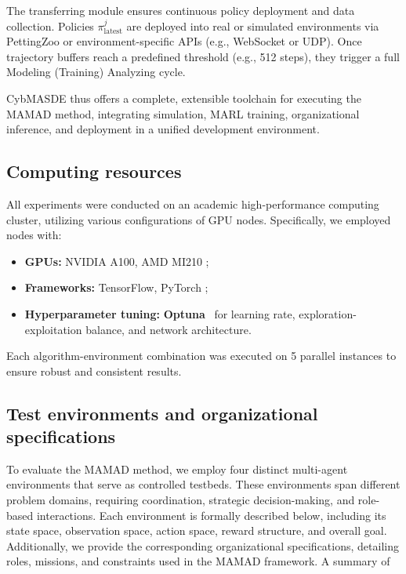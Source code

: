 \documentclass[pdflatex,sn-mathphys-num]{sn-jnl}%
\theoremstyle{thmstyleone}%
\theoremstyle{thmstyletwo}%
\theoremstyle{thmstylethree}%
\begin{document}
The transferring module ensures continuous policy deployment and data collection. Policies $\pi^j_{\text{latest}}$ are deployed into real or simulated environments via PettingZoo or environment-specific APIs (e.g., WebSocket or UDP). Once trajectory buffers reach a predefined threshold (e.g., 512 steps), they trigger a full Modeling (Training) Analyzing cycle.

CybMASDE thus offers a complete, extensible toolchain for executing the MAMAD method, integrating simulation, MARL training, organizational inference, and deployment in a unified development environment.



\subsection{Computing resources}

All experiments were conducted on an academic high-performance computing cluster, utilizing various configurations of GPU nodes. Specifically, we employed nodes with:
\begin{itemize}
    \item \textbf{GPUs:} NVIDIA A100, AMD MI210 ;
    \item \textbf{Frameworks:} TensorFlow, PyTorch ;
    \item \textbf{Hyperparameter tuning:} \textbf{Optuna}~\cite{akiba2019optuna} for learning rate, exploration-exploitation balance, and network architecture.
\end{itemize}

Each algorithm-environment combination was executed on 5 parallel instances to ensure robust and consistent results.

\subsection{Test environments and organizational specifications}

To evaluate the MAMAD method, we employ four distinct multi-agent environments that serve as controlled testbeds. These environments span different problem domains, requiring coordination, strategic decision-making, and role-based interactions. Each environment is formally described below, including its state space, observation space, action space, reward structure, and overall goal. Additionally, we provide the corresponding organizational specifications, detailing roles, missions, and constraints used in the MAMAD framework. A summary of 
\end{document}
